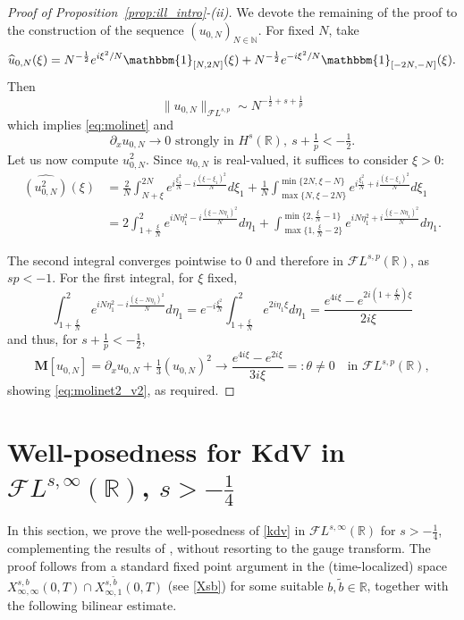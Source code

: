 \documentclass[a4paper,
11pt,  reqno]{amsart}
\newcommand{\5}{\textup{V}}
\newcommand{\noi}{\noindent}
\newcommand{\FL}{\mathcal{F} L}
\newcommand{\F}{\mathcal{F}}
\newcommand{\wt}{\widetilde}
\newcommand{\dx}{\partial_x}
\theoremstyle{remark}
\newcommand{\R}{\mathbb{R}}
\newcommand{\MMb}{\mathbf{M}}
\newcommand{\N}{\mathbb{N}}
\numberwithin{equation}{section}
\numberwithin{theorem}{section}
\begin{document}
\begin{proof}[Proof of Proposition~\ref{prop:ill_intro}-(ii)]
We devote the remaining of the proof to the construction of the sequence $(u_{0,N})_{N\in\N}$.
	For fixed $N$, take
	$$
	\widehat{u}_{0,N}(\xi)= N^{-\frac12} e^{i\xi^2/N}\mathbbm{1}_{[N, 2N]}(\xi) + N^{-\frac12} e^{-i\xi^2/N}\mathbbm{1}_{[-2N, -N]}(\xi).
	$$
	Then
	$$
	\|u_{0,N}\|_{\mathcal{F}L^{s,p}} \sim N^{-\frac12 +s+ \frac1p}
	$$
	which implies \eqref{eq:molinet} and
	$$
	\dx u_{0,N} \to 0 \mbox{ strongly in }H^{s}(\R), \ s+\tfrac1p<-\tfrac12.
	$$
	Let us now compute $u_{0,N}^2$. Since $u_{0,N}$ is real-valued, it suffices to consider $\xi>0$:
	\begin{align*}
		\widehat{(u_{0,N}^2)}(\xi) &= \frac{2}{N}\int_{N+\xi}^{2N} e^{i\frac{\xi_1^2}{N}-i\frac{(\xi-\xi_1)^2}{N}}d\xi_1 + \frac{1}{N}\int_{\max\{N, \xi-2N\}}^{\min\{2N, \xi-N\}}  e^{i\frac{\xi_1^2}{N}+i\frac{(\xi-\xi_1)^2}{N}}d\xi_1\\&=2\int_{1+\frac\xi N}^{2} e^{iN\eta_1^2-i\frac{(\xi-N\eta_1)^2}{N}}d\eta_1 + \int_{\max\{1, \frac{\xi}{N}-2\}}^{\min\{2, \frac{\xi}{N}-1\}}  e^{iN\eta_1^2+i\frac{(\xi-N\eta_1)^2}{N}}d\eta_1
        .
	\end{align*}


    \noi
The second integral converges pointwise to $0$ and therefore in $\mathcal{F}L^{s,p}(\R)$, as $sp<-1$. For the first integral,  for $\xi$ fixed,
\begin{equation}
	\int_{1+\frac\xi N}^{2} e^{iN\eta_1^2-i\frac{(\xi-N\eta_1)^2}{N}}d\eta_1 = e^{-i\frac{\xi^2}{N}}\int_{1 + \frac{\xi}{N}}^{2} e^{2i\eta_1\xi}d\eta_1  = \frac{e^{4i\xi}-e^{2i\left(1+\frac{\xi}{N}\right)\xi}}{2i\xi}
\end{equation}
and thus, for $s+\frac1p<-\frac12$,
\begin{equation}
	\MMb[u_{0,N}]= \dx u_{0,N} + \tfrac13 (u_{0,N})^2 \to \frac{e^{4i\xi}-e^{2i\xi}}{3i\xi} =: \theta \ne 0
    \quad \mbox{in }\mathcal{F}L^{s,p}(\R),
\end{equation}
showing \eqref{eq:molinet2_v2}, as required.
\end{proof}


\appendix




\section{Well-posedness for KdV in $\F L^{s,\infty}(\R)$, $s>-\frac14$}\label{sec:-14}

In this section, we prove the well-posedness of \eqref{kdv}
 in $\FL^{s, \infty}(\R)$ for $s>-\frac14$, complementing the results of \cite{Grunrock_ldv_hier}, without resorting to the gauge transform.
The proof follows from a standard fixed point argument in the (time-localized) space $X^{s, b}_{\infty, \infty} (0,T) \cap X^{s, \wt b }_{\infty, 1} (0,T)$ (see \eqref{Xsb}) for some  suitable $b,\wt b\in \R$,
together with the following bilinear estimate.
\end{document}
